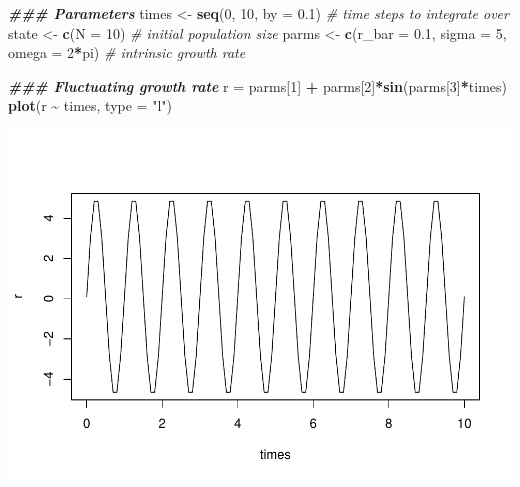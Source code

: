 \documentclass[
]{book}
\newenvironment{Shaded}{\begin{snugshade}}{\end{snugshade}}
\newcommand{\AttributeTok}[1]{\textcolor[rgb]{0.13,0.29,0.53}{#1}}
\newcommand{\CommentTok}[1]{\textcolor[rgb]{0.56,0.35,0.01}{\textit{#1}}}
\newcommand{\DecValTok}[1]{\textcolor[rgb]{0.00,0.00,0.81}{#1}}
\newcommand{\DocumentationTok}[1]{\textcolor[rgb]{0.56,0.35,0.01}{\textbf{\textit{#1}}}}
\newcommand{\FloatTok}[1]{\textcolor[rgb]{0.00,0.00,0.81}{#1}}
\newcommand{\FunctionTok}[1]{\textcolor[rgb]{0.13,0.29,0.53}{\textbf{#1}}}
\newcommand{\NormalTok}[1]{#1}
\newcommand{\OtherTok}[1]{\textcolor[rgb]{0.56,0.35,0.01}{#1}}
\newcommand{\SpecialCharTok}[1]{\textcolor[rgb]{0.81,0.36,0.00}{\textbf{#1}}}
\newcommand{\StringTok}[1]{\textcolor[rgb]{0.31,0.60,0.02}{#1}}
\begin{document}
\begin{Shaded}
\begin{Highlighting}[]
\DocumentationTok{\#\#\# Parameters}
\NormalTok{times }\OtherTok{\textless{}{-}} \FunctionTok{seq}\NormalTok{(}\DecValTok{0}\NormalTok{, }\DecValTok{10}\NormalTok{, }\AttributeTok{by =} \FloatTok{0.1}\NormalTok{)  }\CommentTok{\# time steps to integrate over}
\NormalTok{state }\OtherTok{\textless{}{-}} \FunctionTok{c}\NormalTok{(}\AttributeTok{N =} \DecValTok{10}\NormalTok{)  }\CommentTok{\# initial population size}
\NormalTok{parms }\OtherTok{\textless{}{-}} \FunctionTok{c}\NormalTok{(}\AttributeTok{r\_bar =} \FloatTok{0.1}\NormalTok{, }\AttributeTok{sigma =} \DecValTok{5}\NormalTok{, }\AttributeTok{omega =} \DecValTok{2}\SpecialCharTok{*}\NormalTok{pi)  }\CommentTok{\# intrinsic growth rate}

\DocumentationTok{\#\#\# Fluctuating growth rate}
\NormalTok{r }\OtherTok{=}\NormalTok{ parms[}\DecValTok{1}\NormalTok{] }\SpecialCharTok{+}\NormalTok{ parms[}\DecValTok{2}\NormalTok{]}\SpecialCharTok{*}\FunctionTok{sin}\NormalTok{(parms[}\DecValTok{3}\NormalTok{]}\SpecialCharTok{*}\NormalTok{times)}
\FunctionTok{plot}\NormalTok{(r }\SpecialCharTok{\textasciitilde{}}\NormalTok{ times, }\AttributeTok{type =} \StringTok{"l"}\NormalTok{)}
\end{Highlighting}
\end{Shaded}

\includegraphics{bookdown-demo_files/figure-latex/unnamed-chunk-12-1.pdf}
\end{document}
